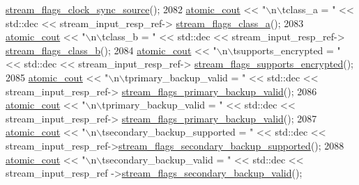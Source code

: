 \begin{DoxyCode}
      \hyperlink{classavdecc__lib_1_1stream__input__descriptor__response_a995e03199cdf8ff67b735e202ee731c9}{stream\_flags\_clock\_sync\_source}();
2082             \hyperlink{cmd__line_8h_a0bc38ccc65c79ba06c6fcd7b4bf554c3}{atomic\_cout} << \textcolor{stringliteral}{"\(\backslash\)n\(\backslash\)tclass\_a = "} << std::dec << stream\_input\_resp\_ref->
      \hyperlink{classavdecc__lib_1_1stream__input__descriptor__response_a12f7c478a280c8847869fc1effda0ac9}{stream\_flags\_class\_a}();
2083             \hyperlink{cmd__line_8h_a0bc38ccc65c79ba06c6fcd7b4bf554c3}{atomic\_cout} << \textcolor{stringliteral}{"\(\backslash\)n\(\backslash\)tclass\_b = "} << std::dec << stream\_input\_resp\_ref->
      \hyperlink{classavdecc__lib_1_1stream__input__descriptor__response_a0c1c9fe75737c0690cefe1597cf0d2f5}{stream\_flags\_class\_b}();
2084             \hyperlink{cmd__line_8h_a0bc38ccc65c79ba06c6fcd7b4bf554c3}{atomic\_cout} << \textcolor{stringliteral}{"\(\backslash\)n\(\backslash\)tsupports\_encrypted = "} << std::dec << stream\_input\_resp\_ref->
      \hyperlink{classavdecc__lib_1_1stream__input__descriptor__response_acf3491baaac1909aeeea303407a15b47}{stream\_flags\_supports\_encrypted}();
2085             \hyperlink{cmd__line_8h_a0bc38ccc65c79ba06c6fcd7b4bf554c3}{atomic\_cout} << \textcolor{stringliteral}{"\(\backslash\)n\(\backslash\)tprimary\_backup\_valid = "} << std::dec << stream\_input\_resp\_ref->
      \hyperlink{classavdecc__lib_1_1stream__input__descriptor__response_a35e1c2d08ac6d699e575f3ba118ef0f7}{stream\_flags\_primary\_backup\_valid}();
2086             \hyperlink{cmd__line_8h_a0bc38ccc65c79ba06c6fcd7b4bf554c3}{atomic\_cout} << \textcolor{stringliteral}{"\(\backslash\)n\(\backslash\)tprimary\_backup\_valid = "} << std::dec << stream\_input\_resp\_ref->
      \hyperlink{classavdecc__lib_1_1stream__input__descriptor__response_a35e1c2d08ac6d699e575f3ba118ef0f7}{stream\_flags\_primary\_backup\_valid}();
2087             \hyperlink{cmd__line_8h_a0bc38ccc65c79ba06c6fcd7b4bf554c3}{atomic\_cout} << \textcolor{stringliteral}{"\(\backslash\)n\(\backslash\)tsecondary\_backup\_supported = "} << std::dec << 
      stream\_input\_resp\_ref->\hyperlink{classavdecc__lib_1_1stream__input__descriptor__response_acb3e666eaff1f1303ba9c2733aee3d52}{stream\_flags\_secondary\_backup\_supported}();
2088             \hyperlink{cmd__line_8h_a0bc38ccc65c79ba06c6fcd7b4bf554c3}{atomic\_cout} << \textcolor{stringliteral}{"\(\backslash\)n\(\backslash\)tsecondary\_backup\_valid = "} << std::dec << stream\_input\_resp\_ref
      ->\hyperlink{classavdecc__lib_1_1stream__input__descriptor__response_a83765255f81d93d3bb28eeb9edec8904}{stream\_flags\_secondary\_backup\_valid}();

\end{DoxyCode}
